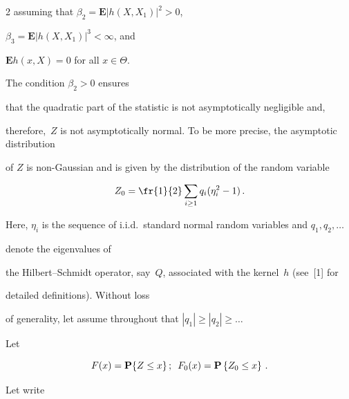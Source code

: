 \begin{multicols}{2}
assuming that $ \beta_{2}=\mathbf{E}|h(X,X_1)|^{2}>0$, 

$\beta_{3}$\linebreak $=\mathbf{E}|h(X,X_1)|^{3} <\infty$, and 

$\mathbf{E}h(x,X)=0$ for all  $x \in\Theta$.



    The condition $\beta_{2}>0$ ensures

    that the quadratic part of the statistic is not asymptotically negligible and,

    therefore,~$Z$ is not asymptotically normal. To be more precise, the asymptotic distribution

    of $Z$ is non-Gaussian and is given by the distribution of the random variable

    

    \vspace*{2pt}

    

    \noindent

  \begin{equation*}


    Z_0=\fr{1}{2}\sum\limits_{i\geq 1}q_i(\eta_i^{2}-1)\,. 

    \end{equation*}

    Here, $\eta_i$ is the sequence of i.i.d.\ standard normal random variables and $q_1,q_2,\ldots$

    denote the eigenvalues of

    the Hilbert--Schmidt operator, say~$Q$, associated with the kernel~$h$ (see~[1] for

    detailed definitions). Without loss

    of generality, let assume throughout that $|q_1|\geq |q_2|\geq\ldots$



    Let

    

    \noindent

    \begin{equation*}

    \label{o}

    F(x)=\mathbf{P}\{Z\leq x\}\,; \enskip F_0(x)=\mathbf{P}\left\{Z_0\leq x\right\}\,.

\end{equation*}

     Let write


\end{multicols}

